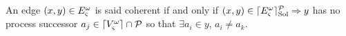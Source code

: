 \begin{comment}
\begin{definition}
  \label{def:aS}
  The abstract structure $\cwB=(\Breq,\Bsol,\Brsp,\Bcont)$ is defined as
  $\cwB = \sfp{\aB^\w_\ctx}{\myB}{\aB^\w_{\ctx \Cap \allprocs_\ctx(\myB)}}$,\\
  with $\myB=(\myreq,\mysol,\myrsp,\mycont)$:
  \begin{align*}
    \myreq &= \{ (a_i,\PHobjp{a}{j}{i}) \in \PHproc \times \Obj \mid
      a \in \components \wedge a_j \in \PHget{\ctx}{a} \\ %
      & \qquad \wedge ((\exists (P,ps) \in \mysol \vee \exists (b_j, ps) \in \myrsp), a_i \in ps \\
      & \qquad\qquad \vee \exists n \in \indexes{\w}, \PHbounce(\w_n)=a_i) \}
    \\
    \mysol &\subseteq \{ (P,ps) \in \Obj \times \powerset(\PHproc) \mid
            \exists (a_i, P) \in \myreq \wedge ps \in \aBS(P) \\
      & \qquad\qquad \vee \exists (Q, P) \in \mycont \wedge ps \in \aBS(P) \}
    \\
    \myrsp &= \{ (a_i,ps) \in \PHproc \times \powerset(\PHproc) \mid a \in \cs \\
      & \qquad \wedge (\exists (P,ps') \in \mysol \vee \exists (b_j,ps') \in \myrsp), \\
      & \qquad\qquad a_i \in ps' \wedge \csState(a_i) \in ps \}
    \\
    \mycont & = \{ (P, \PHobj{q}{\PHbounce(P)}) \in \Obj \times \Obj \mid
      \exists (P, ps) \in \mysol \\
      & \qquad\qquad \wedge q \in \gCont_\ctx(\PHsort(P),P) \}
  \end{align*}
\end{definition}

\begin{definition}[Coherent solution]
\label{def:coherent}
  A cooperative sort requisite $(a_i, ps)$ in $\Brsp$ is said coherent iff
  it has no successor $(b_k,\PHobjp{b}{j}{k})$ in $\Breq$ so that there exists $b_n \in ps$, $b_k \neq b_n$.
\end{definition}
\end{comment}

\begin{definition}
\label{def:coherent}
  An edge $(x, y) \in E_\varsigma^\omega$ is said coherent if and only if
  $(x, y) \in \lceil E_\varsigma^\omega\rceil^{\mathcal{P}}_{\mathrm{Sol}} \Rightarrow y$ has no process successor $a_j \in \lceil V_\varsigma^\omega\rceil \cap \mathcal{P}$ so that $\exists a_i \in y$, $a_i \neq a_k$.
\end{definition}

